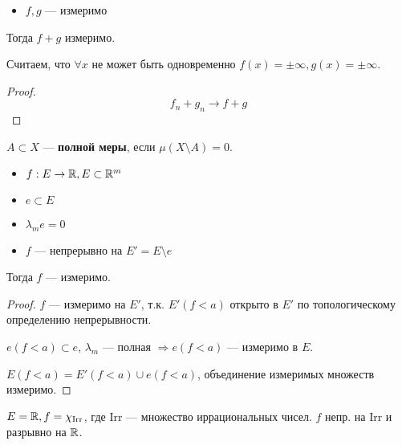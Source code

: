 \begin{corollary}\itemfix
    \begin{itemize}
        \item \(f, g\) --- измеримо
    \end{itemize}

    Тогда \(f + g\) измеримо.

    \begin{remark}
        Считаем, что \(\forall x\) не может быть одновременно \(f(x) = \pm \infty, g(x) = \pm \infty\).
    \end{remark}
\end{corollary}

\begin{proof}
    \[f_n + g_n \to f + g\]
\end{proof}

\begin{theorem}
    \begin{remark}
        \(A\subset X\) --- \textbf{полной меры}, если \(\mu(X\setminus A) = 0\).
    \end{remark}

    \begin{itemize}
        \item \(f: E \to \mathbb{R}, E\subset \mathbb{R}^m\)
        \item \(e\subset E\)
        \item \(\lambda_m e = 0\)
        \item \(f\) --- непрерывно на \(E' = E \setminus e\)
    \end{itemize}

    Тогда \(f\) --- измеримо.
\end{theorem}
\begin{proof}
    \(f\) --- измеримо на \(E'\), т.к. \(E'(f < a)\) открыто в \(E'\) по топологическому определению непрерывности.

    \(e(f < a) \subset e\), \(\lambda_m\) --- полная \( \Rightarrow e(f < a)\) --- измеримо в \(E\).

    \(E(f < a) = E'(f < a)\cup e(f < a)\), объединение измеримых множеств измеримо.
\end{proof}

\begin{example}
    \(E = \mathbb{R}, f = \chi_{\text{Irr}}\), где \(\text{Irr}\) --- множество иррациональных чисел. \(f\) непр. на \(\text{Irr}\) и разрывно на \(\mathbb{R}\).
\end{example}

